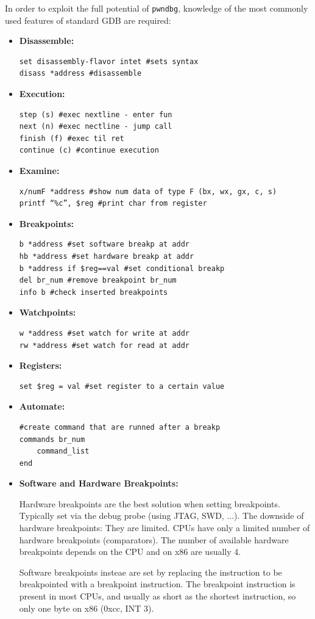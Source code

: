 \documentclass{article}
\begin{document}
In order to exploit the full potential of \texttt{pwndbg}, knowledge of the most commonly used features of standard
GDB are required:
\begin{itemize}
\item{\textbf{Disassemble:}}
\begin{verbatim}
set disassembly-flavor intet #sets syntax
disass *address #disassemble
\end{verbatim}
\item{\textbf{Execution:}}
\begin{verbatim}
step (s) #exec nextline - enter fun
next (n) #exec nectline - jump call
finish (f) #exec til ret
continue (c) #continue execution
\end{verbatim}
\item{\textbf{Examine:}}
\begin{verbatim}
x/numF *address #show num data of type F (bx, wx, gx, c, s)
printf “%c”, $reg #print char from register
\end{verbatim}
\item{\textbf{Breakpoints:}}
\begin{verbatim}
b *address #set software breakp at addr
hb *address #set hardware breakp at addr
b *address if $reg==val #set conditional breakp
del br_num #remove breakpoint br_num
info b #check inserted breakpoints
\end{verbatim}
\item{\textbf{Watchpoints:}}
\begin{verbatim}
w *address #set watch for write at addr
rw *address #set watch for read at addr
\end{verbatim}
\item{\textbf{Registers:}}
\begin{verbatim}
set $reg = val #set register to a certain value
\end{verbatim}
\item{\textbf{Automate:}}
\begin{verbatim}
#create command that are runned after a breakp
commands br_num
    command_list
end
\end{verbatim}

\item{\textbf{Software and Hardware Breakpoints:}}

Hardware breakpoints are the best solution when setting breakpoints. 
Typically set via the debug probe (using JTAG, SWD, ...). The downside of hardware 
breakpoints: They are limited. CPUs have only a limited number of hardware breakpoints 
(comparators). The number of available hardware breakpoints depends on the CPU
and on x86 are usually 4.

Software breakpoints insteae are set by replacing the instruction to be 
breakpointed with a breakpoint instruction. The breakpoint instruction is present 
in most CPUs, and usually as short as the shortest instruction, so only one byte 
on x86 (0xcc, INT 3).

\end{itemize}
\end{document}
